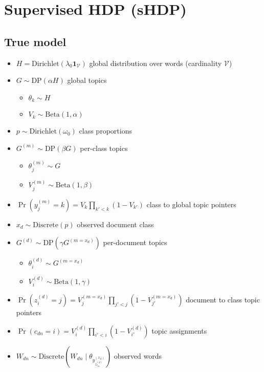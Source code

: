 \documentclass{article}
\newcommand{\Beta}{\ensuremath{\mathrm{Beta}}}
\newcommand{\Dirichlet}{\ensuremath{\mathrm{Dirichlet}}}
\newcommand{\Discrete}{\ensuremath{\mathrm{Discrete}}}
\newcommand{\DP}{\ensuremath{\mathrm{DP}}}
\newcommand{\V}{\ensuremath{\mathcal{V}}}
\newcommand{\one}{\ensuremath{\mathbf{1}}}
\begin{document}
\section*{Supervised HDP (sHDP)}

\subsection*{True model}

\begin{itemize}
\item $\displaystyle H = \Dirichlet\left(\lambda_0 \one_\V\right)$ global distribution over words (cardinality $\V$)
\item $G \sim \DP\left(\alpha H\right)$ global topics
    \begin{itemize}
    \item $\theta_k \sim H$
    \item $V_k \sim \Beta(1, \alpha)$
    \end{itemize}
\item $p \sim \Dirichlet(\omega_0)$ class proportions
\item $G^{(m)} \sim \DP\left(\beta G\right)$ per-class topics
    \begin{itemize}
    \item $\theta_j^{(m)} \sim G$
    \item $V_j^{(m)} \sim \Beta(1, \beta)$
    \end{itemize}
\item $\Pr(y_j^{(m)} = k) = V_k \prod_{k'<k} (1 - V_{k'})$ class to global topic pointers
\item $x_d \sim \Discrete(p)$ observed document class
\item $G^{(d)} \sim \DP\left(\gamma G^{(m=x_d)}\right)$ per-document topics
    \begin{itemize}
    \item $\theta_i^{(d)} \sim G^{(m=x_d)}$
    \item $V_i^{(d)} \sim \Beta(1, \gamma)$
    \end{itemize}
\item $\Pr(z_i^{(d)} = j) = V_j^{(m=x_d)} \prod_{j'<j} (1 - V_{j'}^{(m=x_d)})$ document to class topic pointers
\item $\Pr(c_{dn} = i) = V_i^{(d)} \prod_{i'<i} (1 - V_{i'}^{(d)})$ topic assignments
\item $W_{dn} \sim \Discrete(W_{dn} \mid \theta_{y^{(x_d)}_{z^{(d)}_{c_{dn}}}})$ observed words
\end{itemize}
\end{document}
